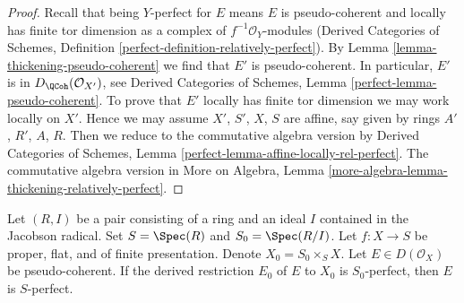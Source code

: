\begin{proof}
Recall that being $Y$-perfect for $E$ means $E$ is
pseudo-coherent and locally has finite tor dimension as a complex
of $f^{-1}\mathcal{O}_Y$-modules
(Derived Categories of Schemes,
Definition \ref{perfect-definition-relatively-perfect}).
By Lemma \ref{lemma-thickening-pseudo-coherent}
we find that $E'$ is pseudo-coherent.
In particular, $E'$ is in $D_\QCoh(\mathcal{O}_{X'})$, see
Derived Categories of Schemes, Lemma \ref{perfect-lemma-pseudo-coherent}.
To prove that $E'$ locally has finite tor dimension
we may work locally on $X'$. Hence we may assume
$X'$, $S'$, $X$, $S$ are affine, say given by
rings $A'$, $R'$, $A$, $R$.
Then we reduce to the commutative algebra version by
Derived Categories of Schemes,
Lemma \ref{perfect-lemma-affine-locally-rel-perfect}.
The commutative algebra version in More on Algebra, Lemma
\ref{more-algebra-lemma-thickening-relatively-perfect}.
\end{proof}

\begin{lemma}
\label{lemma-henselian-relatively-perfect}
Let $(R, I)$ be a pair consisting of a ring and an ideal $I$
contained in the Jacobson radical. Set $S = \Spec(R)$ and $S_0 = \Spec(R/I)$.
Let $f : X \to S$ be proper, flat, and of finite presentation.
Denote $X_0 = S_0 \times_S X$. Let $E \in D(\mathcal{O}_X)$
be pseudo-coherent. If the derived restriction $E_0$ of $E$
to $X_0$ is $S_0$-perfect, then $E$ is $S$-perfect.
\end{lemma}

